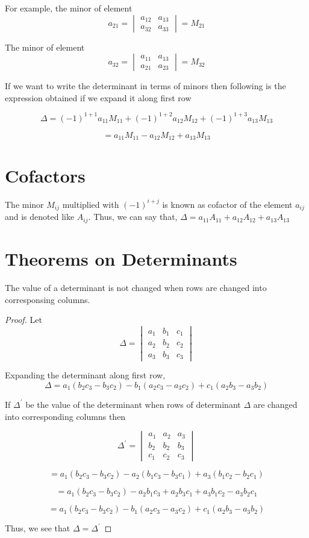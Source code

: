 For example, the minor of element $$a_{21}=\begin{vmatrix}a_{12} & a_{13}\\a_{32} & a_{33}\end{vmatrix} = M_{21}$$

The minor of element $$a_{32} = \begin{vmatrix}a_{11} & a_{13}\\a_{21} &a_{23}\end{vmatrix} = M_{32}$$

If we want to write the determinant in terms of minors then following is the expression obtained if we expand it along first row

$$\Delta = (-1)^{1+1}a_{11}M_{11} + (-1)^{1 + 2}a_{12}M_{12} + (-1)^{1 + 3}a_{13}M_{13}$$

$$=a_{11}M_{11} - a_{12}M_{12} + a_{13}M_{13}$$

\section{Cofactors}
The minor $M_{ij}$ multiplied with $(-1)^{i+j}$ is known as cofactor of the element $a_{ij}$ and is denoted like $A_{ij}$. Thus, we
can say that, $\Delta = a_{11}A_{11} + a_{12}A_{12} + a_{13}A_{13}$

\section{Theorems on Determinants}
\begin{theorem}
  The value of a determinant is not changed when rows are changed into corresponsing columns.
\end{theorem}

\begin{proof}
  Let $$\Delta = \begin{vmatrix}a_1 & b_1 & c_1\\a_2 & b_2 & c_2\\ a_3 & b_3 &c_3\end{vmatrix}$$

Expanding the determinant along first row, $$\Delta = a_1(b_2c_3 - b_3c_2) - b_1(a_2c_3 - a_3c_2) + c_1(a_2b_3 - a_3b_2)$$

If $\Delta^{\prime}$ be the value of the determinant when rows of determinant $\Delta$ are changed into corresponding columns then

$$\Delta^{\prime} = \begin{vmatrix}a_1&a_2&a_3\\b_2&b_2 & b_3\\ c_1 & c_2 & c_3\end{vmatrix}$$

$$= a_1(b_2c_3 - b_3c_2) - a_2(b_1c_3 - b_3c_1) + a_3(b_1c_2 - b_2c_1)$$

$$= a_1(b_2c_3 - b_3c_2) - a_2b_1c_3 + a_2b_3c_1 + a_3b_1c_2 - a_3b_2c_1$$

$$= a_1(b_2c_3 - b_3c_2) - b_1(a_2c_3 - a_3c_2) + c_1(a_2b_3 - a_3b_2)$$

Thus, we see that $\Delta = \Delta^{\prime}$

\end{proof}

